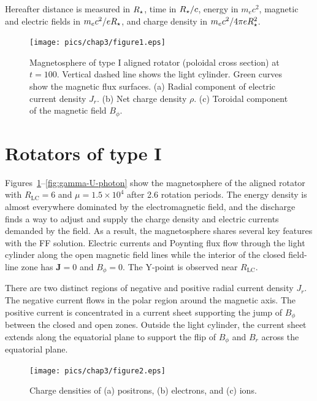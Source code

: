 Hereafter distance is measured in $R_{\star}$, time in $R_{\star}/c$, energy in $m_ec^2$,
magnetic and electric fields in $m_ec^2/eR_{\star}$, and
charge density in $m_e c^2/4\pi eR_{\star}^2$.


\begin{figure}[t]
 \hspace*{-0.6cm}
    \texttt{[image: pics/chap3/figure1.eps]}
    \caption[Magnetosphere of type I aligned rotator]{\small
    Magnetosphere of type I aligned rotator (poloidal cross section) at $t = 100$.
    Vertical dashed line shows the light cylinder.
    Green curves show the magnetic flux surfaces.
    (a) Radial component of electric current density $J_r$.
           (b) Net charge density $\rho$.
           (c) Toroidal component of the magnetic field $B_\phi$.
 }
    \label{fig:j-rho-bphi}
\end{figure}

\section{Rotators of type I}


Figures~\ref{fig:j-rho-bphi}--\ref{fig:gamma-U-photon} show the magnetosphere of the
aligned rotator with $R_\mathrm{LC}=6$ and $\mu=1.5\times 10^4$ after 2.6 rotation periods.
The energy density is almost everywhere dominated by the electromagnetic
field, and the discharge finds a way to adjust and supply the charge density and
electric currents demanded by the field. As a result, the magnetosphere
shares several key features with the FF solution.
Electric currents and Poynting flux flow through the light cylinder along
the open magnetic field lines while the interior of the closed field-line zone
has $\mathbf{J}=0$ and $B_\phi=0$. The Y-point is observed near $R_\mathrm{LC}$.

There are two distinct regions of negative and positive radial current density $J_r$.
The negative current flows in the polar region around the magnetic axis.
The positive current is concentrated in a current sheet supporting
the jump of $B_\phi$ between the closed and open zones.
Outside the light cylinder, the current sheet extends along the equatorial plane
to support the flip of $B_\phi$ and $B_r$ across the equatorial plane.

\begin{figure}[t]
\hspace*{-0.6cm}
    \texttt{[image: pics/chap3/figure2.eps]}
    \caption[Charge densities of type I aligned rotator]{\small
Charge densities of (a) positrons, (b) electrons, and (c) ions.
}
    \label{fig:rho-pn-corotation}
\end{figure}


